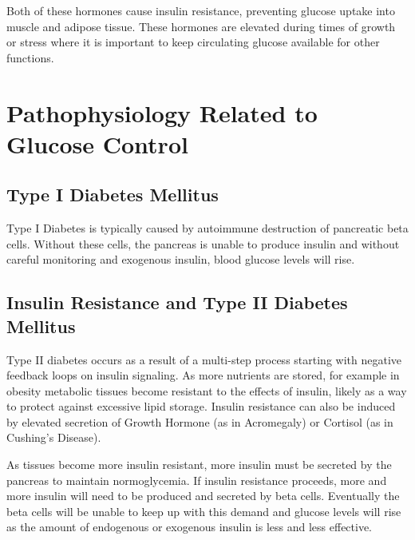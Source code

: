 \documentclass{tufte-handout}
\begin{document}
  Both of these hormones cause insulin resistance, preventing glucose uptake into muscle and adipose tissue.  These hormones are elevated during times of growth or stress where it is important to keep circulating glucose available for other functions.

\section{Pathophysiology Related to Glucose Control}

\subsection{Type I Diabetes Mellitus}

Type I Diabetes is typically caused by autoimmune destruction of pancreatic beta cells.  Without these cells, the pancreas is unable to produce insulin and without careful monitoring and exogenous insulin, blood glucose levels will rise.

\subsection{Insulin Resistance and Type II Diabetes Mellitus}

Type II diabetes occurs as a result of a multi-step process starting with negative feedback loops on insulin signaling.  As more nutrients are stored, for example in obesity metabolic tissues become resistant to the effects of insulin, likely as a way to protect against excessive lipid storage.  Insulin resistance can also be induced by elevated secretion of Growth Hormone (as in Acromegaly) or Cortisol (as in Cushing's Disease).

As tissues become more insulin resistant, more insulin must be secreted by the pancreas to maintain normoglycemia.  If insulin resistance proceeds, more and more insulin will need to be produced and secreted by beta cells.  Eventually the beta cells will be unable to keep up with this demand and glucose levels will rise as the amount of endogenous or exogenous insulin is less and less effective.


\listoffigures
\listoftables



\end{document}
